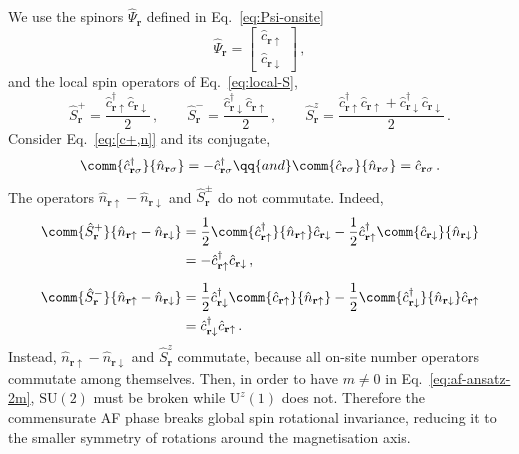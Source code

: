 \begin{tabproof}
	We use the spinors $\hat \Psi_\mathbf{r}$ defined in Eq.~\eqref{eq:Psi-onsite} 
	\[
	\hat \Psi_\mathbf{r} = \begin{bmatrix}
		\hat c_{\mathbf{r}\uparrow} \\ \hat c_{\mathbf{r}\downarrow}
	\end{bmatrix} \, ,
	\]
	and the local spin operators of Eq.~\eqref{eq:local-S},
	\[
	\hat S_\mathbf{r}^+ = \frac{\hat c_{\mathbf{r}\uparrow}^\dagger \hat c_{\mathbf{r}\downarrow}}{2} \, ,
	\qquad
	\hat S_\mathbf{r}^- = \frac{\hat c_{\mathbf{r}\downarrow}^\dagger \hat c_{\mathbf{r}\uparrow}}{2} \, ,
	\qquad
	\hat S_\mathbf{r}^z = \frac{\hat c_{\mathbf{r}\uparrow}^\dagger \hat c_{\mathbf{r}\uparrow} + \hat c_{\mathbf{r}\downarrow}^\dagger \hat c_{\mathbf{r}\downarrow}}{2} \, .
	\]
	Consider Eq.~\eqref{eq:[c+,n]} and its conjugate,
	\[
	\comm{\hat c_{\mathbf{r}\sigma}^\dagger}{\hat n_{\mathbf{r}\sigma}} = -\hat c_{\mathbf{r}\sigma}^\dagger
	\qq{and}
	\comm{\hat c_{\mathbf{r}\sigma}}{\hat n_{\mathbf{r}\sigma}} = \hat c_{\mathbf{r}\sigma} \, .
	\]
	The operators $\hat n_{\mathbf{r}\uparrow} - \hat n_{\mathbf{r}\downarrow}$ and $\hat S_\mathbf{r}^\pm$ do not commutate. Indeed,
	\[
	\begin{aligned}
		\comm{\hat S_\mathbf{r}^+}{\hat n_{\mathbf{r}\uparrow} - \hat n_{\mathbf{r}\downarrow}} &= \frac{1}{2} \comm{\hat c_{\mathbf{r}\uparrow}^\dagger}{\hat n_{\mathbf{r}\uparrow}} \hat c_{\mathbf{r}\downarrow} - \frac{1}{2} \hat c_{\mathbf{r}\uparrow}^\dagger \comm{\hat c_{\mathbf{r}\downarrow}}{\hat n_{\mathbf{r}\downarrow}} \\
		&= - \hat c_{\mathbf{r}\uparrow}^\dagger \hat c_{\mathbf{r}\downarrow} \, , \\[0.5em]
		\comm{\hat S_\mathbf{r}^-}{\hat n_{\mathbf{r}\uparrow} - \hat n_{\mathbf{r}\downarrow}} &= \frac{1}{2} \hat c_{\mathbf{r}\downarrow}^\dagger \comm{\hat c_{\mathbf{r}\uparrow}}{\hat n_{\mathbf{r}\uparrow}} - \frac{1}{2} \comm{\hat c_{\mathbf{r}\downarrow}^\dagger}{\hat n_{\mathbf{r}\downarrow}} \hat c_{\mathbf{r}\uparrow} \\
		&= \hat c_{\mathbf{r}\downarrow}^\dagger \hat c_{\mathbf{r}\uparrow} \, .
	\end{aligned}
	\]
	Instead, $\hat n_{\mathbf{r}\uparrow} - \hat n_{\mathbf{r}\downarrow}$ and $\hat S_\mathbf{r}^z$ commutate, because all on-site number operators commutate among themselves. Then, in order to have $m \neq 0$ in Eq.~\eqref{eq:af-ansatz-2m}, $\mathrm{SU}(2)$ must be broken while $\mathrm{U}^z(1)$ does not. Therefore the commensurate AF phase breaks global spin rotational invariance, reducing it to the smaller symmetry of rotations around the magnetisation axis.
\end{tabproof}

